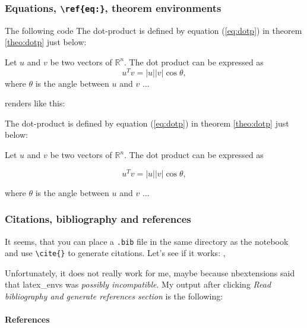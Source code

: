 \subsubsection{\texorpdfstring{Equations,
\texttt{\textbackslash{}ref\{eq:\}}, theorem
environments}{Equations, \textbackslash{}ref\{eq:\}, theorem environments}}\label{equations-refeq-theorem-environments}

The following code
The dot-product is defined by equation (\ref{eq:dotp}) in theorem \ref{theo:dotp} just below:
\begin{theorem} \label{theo:dotp}
Let $u$ and $v$ be two vectors of $\mathbb{R}^n$. The dot product can be expressed as
\begin{equation}
\label{eq:dotp}
u^Tv = |u||v| \cos \theta,
\end{equation}
where $\theta$ is the angle between $u$ and $v$ ...
\end{theorem}
    renders like this:

The dot-product is defined by equation (\ref{eq:dotp}) in theorem
\ref{theo:dotp} just below: \begin{theorem}
\label{theo:dotp} Let \(u\) and \(v\) be two vectors of
\(\mathbb{R}^n\). The dot product can be expressed as

\begin{equation}
\label{eq:dotp}
u^Tv = |u||v| \cos \theta,
\end{equation}

where \(\theta\) is the angle between \(u\) and \(v\) ...
\end{theorem}

    \subsubsection{Citations, bibliography and
references}\label{citations-bibliography-and-references}

It seems, that you can place a \texttt{.bib} file in the same directory
as the notebook and use \texttt{\textbackslash{}cite\{\}} to generate
citations. Let's see if it works: \cite{Thomson1887}, \cite{Hebb1949}

Unfortunately, it does not really work for me, maybe because
nbextensions said that latex\_envs was \emph{possibly incompatible}. My
output after clicking \emph{Read bibliography and generate references
section} is the following:

    \paragraph{References}\label{references}

